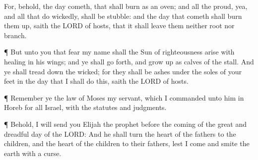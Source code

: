  For, behold, the day cometh, that shall burn as an oven;
and all the proud, yea, and all that do wickedly, shall be stubble: and
the day that cometh shall burn them up, saith the LORD of hosts, that it
shall leave them neither root nor branch.

 ¶ But unto you that fear my name shall the Sun of
righteousness arise with healing in his wings; and ye shall go forth,
and grow up as calves of the stall.  And ye shall tread down
the wicked; for they shall be ashes under the soles of your feet in the
day that I shall do this, saith the LORD of hosts.

 ¶ Remember ye the law of Moses my servant, which I
commanded unto him in Horeb for all Israel, with the statutes and
judgments.

 ¶ Behold, I will send you Elijah the prophet before the
coming of the great and dreadful day of the LORD:  And he
shall turn the heart of the fathers to the children, and the heart of
the children to their fathers, lest I come and smite the earth with a
curse.
